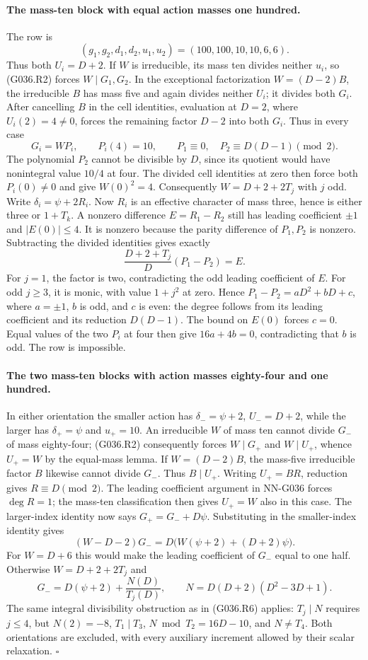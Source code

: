 \paragraph{The mass-ten block with equal action masses one hundred.}
The row is
\[
 (g_1,g_2,d_1,d_2,u_1,u_2)=(100,100,10,10,6,6).
\]
Thus both $U_i=D+2$. If $W$ is irreducible, its mass
ten divides neither $u_i$, so (G036.R2) forces
$W\mid G_1,G_2$. In the exceptional factorization
$W=(D-2)B$, the irreducible $B$ has mass five and
again divides neither $U_i$; it divides both $G_i$.
After cancelling $B$ in the cell identities, evaluation
at $D=2$, where $U_i(2)=4\ne0$, forces the remaining
factor $D-2$ into both $G_i$. Thus in every case
\[
 G_i=WP_i,\qquad P_i(4)=10,\qquad
 P_1\equiv0,\quad P_2\equiv D(D-1)\pmod2.
\]
The polynomial $P_2$ cannot be divisible by $D$,
since its quotient would have nonintegral value $10/4$
at four. The divided cell identities at zero then
force both $P_i(0)\ne0$ and give $W(0)^2=4$.
Consequently $W=D+2+2T_j$ with $j$ odd.
Write $\delta_i=\psi+2R_i$. Now $R_i$ is an effective
character of mass three, hence is either three or
$1+T_k$. A nonzero difference $E=R_1-R_2$ still
has leading coefficient $\pm1$ and $|E(0)|\le4$.
It is nonzero because the parity difference of
$P_1,P_2$ is nonzero.
Subtracting the divided identities gives exactly
\[
 \frac{D+2+T_j}{D}(P_1-P_2)=E.
\]
For $j=1$, the factor is two, contradicting the odd
leading coefficient of $E$. For odd $j\ge3$, it is
monic, with value $1+j^2$ at zero. Hence
$P_1-P_2=aD^2+bD+c$, where $a=\pm1$, $b$ is odd,
and $c$ is even: the degree follows from its leading
coefficient and its reduction $D(D-1)$.
The bound on $E(0)$ forces $c=0$.
Equal values of the two $P_i$ at four then give
$16a+4b=0$, contradicting that $b$ is odd.
The row is impossible.

\paragraph{The two mass-ten blocks with action masses eighty-four and one hundred.}
In either orientation the smaller action has
$\delta_-=\psi+2$, $U_-=D+2$, while the larger
has $\delta_+=\psi$ and $u_+=10$.
An irreducible $W$ of mass ten cannot divide $G_-$
of mass eighty-four; (G036.R2) consequently forces
$W\mid G_+$ and $W\mid U_+$, whence $U_+=W$
by the equal-mass lemma.
If $W=(D-2)B$, the mass-five irreducible factor
$B$ likewise cannot divide $G_-$. Thus $B\mid U_+$.
Writing $U_+=BR$, reduction gives $R\equiv D\pmod2$.
The leading coefficient argument in NN-G036 forces
$\deg R=1$; the mass-ten classification then gives
$U_+=W$ also in this case.
The larger-index identity now says $G_+=G_-+D\psi$.
Substituting in the smaller-index identity gives
\[
 (W-D-2)G_-=D\bigl(W(\psi+2)+(D+2)\psi\bigr).
\]
For $W=D+6$ this would make the leading coefficient
of $G_-$ equal to one half. Otherwise
$W=D+2+2T_j$ and
\[
 G_-=D(\psi+2)+\frac{N(D)}{T_j(D)},\qquad
 N=D(D+2)(D^2-3D+1).
\]
The same integral divisibility obstruction as in
(G036.R6) applies: $T_j\mid N$ requires $j\le4$,
but $N(2)=-8$, $T_1\mid T_3$,
$N\bmod T_2=16D-10$, and $N\ne T_4$.
Both orientations are excluded, with every auxiliary
increment allowed by their scalar relaxation.
\hfill$\square$

